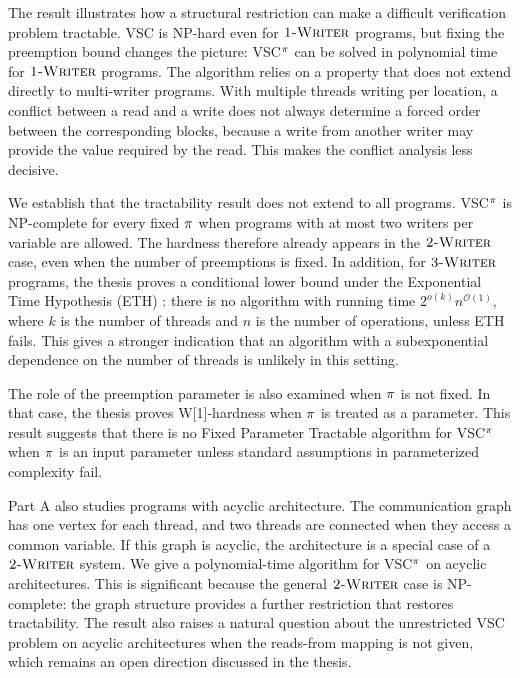 The result illustrates how a structural restriction can make a difficult verification problem tractable. VSC is NP-hard even for $\textsc{1-Writer}$ programs, but fixing the preemption bound changes the picture: VSC$^\pi$ can be solved in polynomial time for $\textsc{1-Writer}$ programs. The algorithm relies on a property that does not extend directly to multi-writer programs. With multiple threads writing per location, a conflict between a read and a write does not always determine a forced order between the corresponding blocks, because a write from another writer may provide the value required by the read. This makes the conflict analysis less decisive.

We establish that the tractability result does not extend to all programs. VSC$^\pi$ is NP-complete for every fixed $\pi$ when programs with at most two writers per variable are allowed. The hardness therefore already appears in the $\textsc{2-Writer}$ case, even when the number of preemptions is fixed. In addition, for $\textsc{3-Writer}$ programs, the thesis proves a conditional lower bound under the Exponential Time Hypothesis (ETH)  \cite{CyganFKLMPPS15,fine-grained-complexity}: there is no algorithm with running time $2^{o(k)}n^{\mathcal{O}(1)}$, where $k$ is the number of threads and $n$ is the number of operations, unless ETH fails. This gives a stronger indication that an algorithm with a subexponential dependence on the number of threads is unlikely in this setting.

The role of the preemption parameter is also examined when $\pi$ is not fixed. In that case, the thesis proves W[1]-hardness when $\pi$ is treated as a parameter. This result suggests that there is no Fixed Parameter Tractable algorithm for VSC$^{\pi}$ when $\pi$ is an input parameter unless standard assumptions in parameterized complexity fail. 

Part A also studies programs with acyclic architecture. The communication graph has one vertex for each thread, and two threads are connected when they access a common variable. If this graph is acyclic, the architecture is a special case of a $\textsc{2-Writer}$ system. We give a polynomial-time algorithm for VSC$^{\pi}$ on acyclic architectures. This is significant because the general $\textsc{2-Writer}$ case is NP-complete: the graph structure provides a further restriction that restores tractability. The result also raises a natural question about the unrestricted VSC problem on acyclic architectures when the reads-from mapping is not given, which remains an open direction discussed in the thesis.


